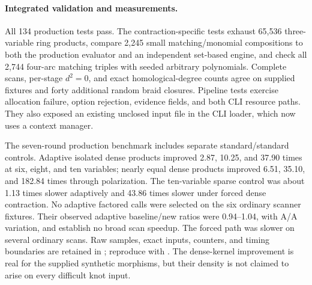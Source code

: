 \paragraph{Integrated validation and measurements.}
All 134 production tests pass. The contraction-specific tests exhaust
65,536 three-variable ring products, compare 2,245 small matching/monomial
compositions to both the production evaluator and an independent set-based
engine, and check all 2,744 four-arc matching triples with seeded arbitrary
polynomials. Complete scans, per-stage $d^2=0$, and exact homological-degree
counts agree on supplied fixtures and forty additional random braid closures.
Pipeline tests exercise allocation failure, option rejection, evidence fields,
and both CLI resource paths. They also exposed an existing unclosed input
file in the CLI loader, which now uses a context manager.

The seven-round production benchmark includes separate standard/standard
controls. Adaptive isolated dense products improved 2.87, 10.25, and 37.90
times at six, eight, and ten variables; nearly equal dense products improved
6.51, 35.10, and 182.84 times through polarization. The ten-variable sparse
control was about 1.13 times slower adaptively and 43.86 times slower under
forced dense contraction. No adaptive factored calls were selected on the
six ordinary scanner fixtures. Their observed adaptive baseline/new ratios
were 0.94--1.04, with A/A variation, and establish no broad scan speedup.
The forced path was slower on several ordinary scans. Raw samples, exact
inputs, counters, and timing boundaries are retained in
; reproduce with
. The dense-kernel improvement
is real for the supplied synthetic morphisms, but their density is not
claimed to arise on every difficult knot input.
